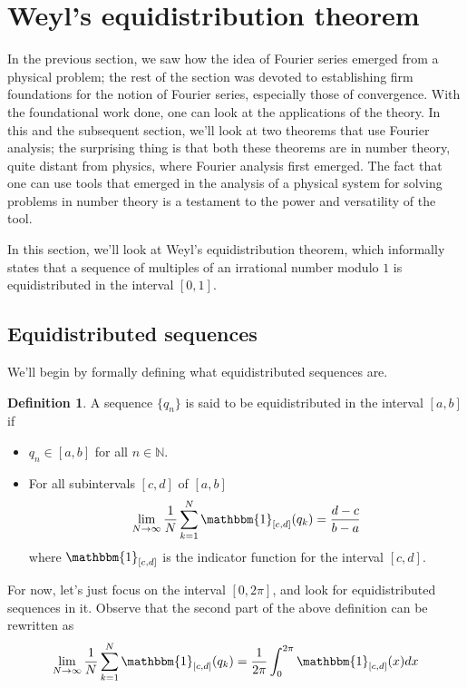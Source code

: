 \documentclass[12pt, titlepage]{article}
\theoremstyle{definition}
\newtheorem{defn}{Definition}[section]
\newcommand{\indi}{\mathbbm{1}}
\begin{document}
\section{Weyl's equidistribution theorem}
In the previous section, we saw how the idea of Fourier series emerged from a physical problem; the rest of the section was devoted to establishing firm foundations for the notion of Fourier series, especially those of convergence. With the foundational work done, one can look at the applications of the theory. In this and the subsequent section, we'll look at two theorems that use Fourier analysis; the surprising thing is that both these theorems are in number theory, quite distant from physics, where Fourier analysis first emerged. The fact that one can use tools that emerged in the analysis of a physical system for solving problems in number theory is a testament to the power and versatility of the tool.

In this section, we'll look at Weyl's equidistribution theorem, which informally states that a sequence of multiples of an irrational number modulo $1$ is equidistributed in the interval $[0,1]$.

\subsection{Equidistributed sequences}
We'll begin by formally defining what equidistributed sequences are.
\begin{defn}
    A sequence $\{q_n\}$ is said to be equidistributed in the interval $[a,b]$ if
    \begin{itemize}
        \item $q_n \in [a,b]$ for all $n \in \mathbb{N}$.
        \item For all subintervals $[c,d]$ of $[a,b]$
                \begin{align*}
                    \lim_{N \to \infty} \frac{1}{N} \sum_{k=1}^{N} \indi_{[c,d]}(q_k) = \frac{d-c}{b-a}
                \end{align*}
                where $\indi_{[c,d]}$ is the indicator function for the interval $[c,d]$.
    \end{itemize}
\end{defn}
For now, let's just focus on the interval $[0,2\pi]$, and look for equidistributed sequences in it. Observe that the second part of the above definition can be rewritten as
\begin{align}
    \lim\limits_{N \to \infty} \frac{1}{N} \sum_{k=1}^{N} \indi_{[c,d]}(q_k) = \frac{1}{2\pi} \int_{0}^{2\pi} \indi_{[c,d]}(x) dx \label{eq:6}
\end{align}
\end{document}
